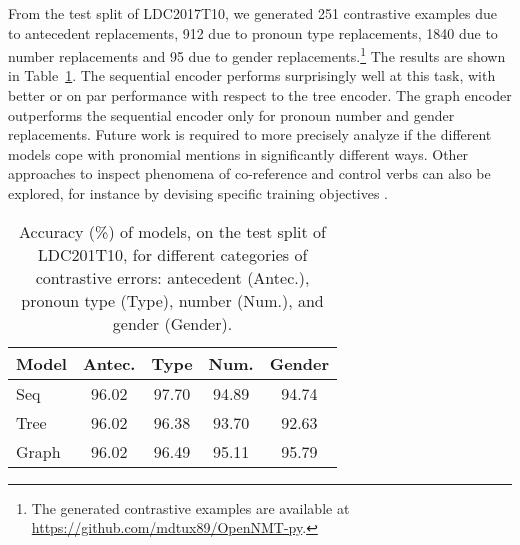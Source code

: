 \documentclass[11pt,a4paper]{article}
\begin{document}
From the test split of LDC2017T10, we generated 251 contrastive examples due to antecedent replacements, 912 due to pronoun type replacements, 1840 due to number replacements and 95 due to gender replacements.\footnote{The generated contrastive examples are available at \url{https://github.com/mdtux89/OpenNMT-py}.}
The results are shown in Table~\ref{tab:contrastive}. The sequential encoder performs surprisingly well at this task, with better or on par performance with respect to the tree encoder. The graph encoder outperforms the sequential encoder only for pronoun number and gender replacements. 
Future work is required to more precisely analyze if the different models cope with pronomial mentions in significantly different ways. Other approaches to inspect phenomena of co-reference and control verbs can also be explored, for instance by devising specific training objectives \cite{linzen2016assessing}.

\begin{table}
\centering
\begin{tabular}{lcccc}
\toprule
\textbf{Model} & \textbf{Antec.} & \textbf{Type} & \textbf{Num.} & \textbf{Gender}\\
\midrule
{\sc Seq} & 96.02 & 97.70 & 94.89 & 94.74\\
{\sc Tree} & 96.02 & 96.38 & 93.70 & 92.63\\ 
{\sc Graph} & 96.02 & 96.49 & 95.11 & 95.79\\
\bottomrule
\end{tabular}
\caption{Accuracy (\%) of models, on the test split of LDC201T10, for different categories of contrastive errors: antecedent (Antec.), pronoun type (Type), number (Num.), and gender (Gender).}
\label{tab:contrastive}
\end{table}
\end{document}
